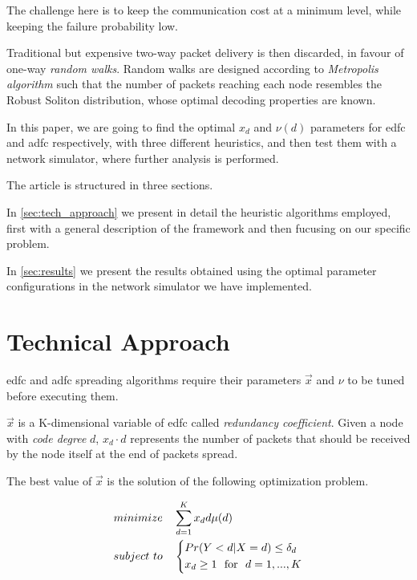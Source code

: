 \documentclass[12pt,journal,draftclsnofoot,onecolumn]{IEEEtran}
\begin{document}
The challenge here is to keep the communication cost at a minimum level, while keeping the failure probability low.

Traditional but expensive two-way packet delivery is then discarded, in favour of one-way \emph{random walks}.
Random walks are designed according to \emph{Metropolis algorithm} such that the number of packets reaching each node resembles the Robust Soliton distribution, whose optimal decoding properties are known\cite{Luby}.

In this paper, we are going to find the optimal $x_d$ and $\nu(d)$ parameters for \gls{edfc} and \gls{adfc} respectively, with three different heuristics, and then test them with a network simulator, where further analysis is performed.

The article is structured in three sections.

In \autoref{sec:tech_approach} we present in detail the heuristic algorithms employed, first with a general description of the framework and then fucusing on our specific problem.

In \autoref{sec:results} we present the results obtained using the optimal parameter configurations in the network simulator we have implemented.

\section{Technical Approach}
\label{sec:tech_approach}

\gls{edfc} and \gls{adfc} spreading algorithms require their parameters $\vec{x}$ and $\nu$ to be tuned before executing them.

$\vec{x}$ is a K-dimensional variable of \gls{edfc} called \emph{redundancy coefficient}. Given a node with \emph{code degree} $d$, $x_d \cdot d$ represents the number of packets that should be received by the node itself at the end of packets spread.

The best value of $\vec{x}$ is the solution of the following optimization problem\cite{Lin2007}.

\begin{equation}
	\label{firstproblem}
	\begin{split}
		minimize & \quad \sum_{d=1}^K x_d d \mu (d) \\
		subject \ to & \quad \begin{dcases}
			Pr(Y<d|X=d) \leq \delta_d \\
			x_d \geq 1 \text{ ~for~ } d = 1,...,K
		\end{dcases}
	\end{split}
\end{equation}
\end{document}
